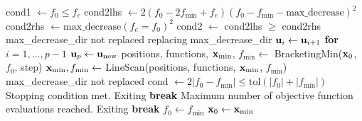 \begin{algorithm}
\begin{algorithmic}[1]
            \State cond1 $\gets f_0 \leq f_e$
            \State cond2lhs $\gets 2(f_0 - 2f_{\text{min}} + f_e)(f_0 - f_{\text{min}} - \text{max\_decrease})^2$
            \State cond2rhs $\gets \text{max\_decrease}(f_e = f_0)^2$
            \State cond2 $\gets$ cond2lhs $\geq$ cond2rhs
                \State \Output max\_decrease\_dir not replaced
                \State \Output replacing max\_decrease\_dir
                \State $\vb{u}_i\gets \vb{u}_{i+1}$ \textbf{for} $i=1,\dots, p-1$
                \State $\vb{u}_p\gets \vb{u}_{\text{new}}$
                \State positions, functions, $\vb{x}_{\text{min}}$, $f_{\text{min}}\gets  $ BracketingMin($\vb{x}_0$, $f_0$, step)
                \State $\vb{x}_{\text{min}}, f_{\text{min}} \gets$ LineScan(positions, functions, $\vb{x}_{\text{min}}$, $f_{\text{min}}$)
            \Else
                \State \Output max\_decrease\_dir not replaced
            \EndIf
            \State cond $\gets 2 |f_0 - f_{\text{min}}|\leq \text{tol}(|f_0|  + |f_{\text{min}}|)$
                \State\Output Stopping condition met. Exiting
                \State \textbf{break}
                \State Maximum number of objective function evaluations reached. Exiting
                \State\textbf{break}
            \EndIf
            \State $f_0\gets f_{\text{min}}$
            \State $\vb{x}_0\gets \vb{x}_{\text{min}}$

        \EndFor
    \EndFunction
    \end{algorithmic}
    \end{algorithm}
